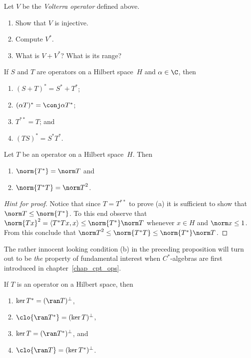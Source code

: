 \begin{exer} Let $V$ be the \emph{Volterra operator} defined above.
 \begin{enumerate}
  \item[(a)] Show that $V$ is injective.
  \item[(b)] Compute $V^*$.
  \item[(c)] What is $V + V^*$?  What is its range?
 \end{enumerate}
\end{exer}

\begin{prop}\label{prop_adj_invol} If $S$ and $T$ are operators on a Hilbert space~$H$ and $\alpha \in \C$, then
 \begin{enumerate}[label=\rm{(\alph*)}]
  \item $(S + T)^* = S^* + T^*$;
  \item $(\alpha T)^* = \conj\alpha T^*$;
  \item $T^{**} = T$; and
  \item $(TS)^* = S^*T^*$.
 \end{enumerate}
\end{prop}

\begin{prop}\label{C063544} Let $T$ be an operator on a Hilbert space~$H$. Then
   \begin{enumerate}[label=\rm{(\alph*)}]
     \item $\norm{T^*} = \norm T$ and
     \item $\norm{T^*T} = {\norm T}^2$.
   \end{enumerate}
\end{prop}

\begin{proof}[\emph{Hint for proof}] Notice that since $T = T^{**}$ to prove (a) it is sufficient to show that $\norm T \le \norm{T^*}$.
To this end observe that ${\norm{Tx}}^2 = \langle T^*Tx,x \rangle \le \norm{T^*}\norm T$ whenever $x \in H$ and $\norm x \le 1$.  From
this conclude that ${\norm T}^2 \le \norm{T^*T} \le \norm{T^*}\norm T$.  \ns
\end{proof}

The rather innocent looking condition (b) in the preceding proposition will turn out to be \emph{the} property of fundamental interest
when $C^*$-algebras are first introduced in chapter~\ref{chap_cpt_ops}.

\begin{prop}\label{prop_ker_adj_perp_ran_op} If $T$ is an operator on a Hilbert space, then
 \begin{enumerate}[label=\rm{(\alph*)}]
   \item $\ker T^* = (\ran T)^\perp$,
   \item $\clo{\ran T^*} = (\ker T)^\perp$,
   \item $\ker T = (\ran T^*)^\perp$, and
   \item $\clo{\ran T} = (\ker T^*)^\perp$.
 \end{enumerate}
\end{prop}

